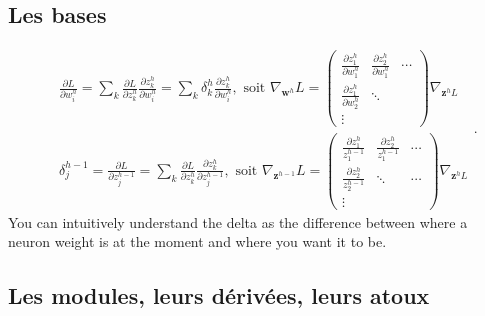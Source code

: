 \documentclass{article}
\theoremstyle{plain}%
\theoremstyle{definition}
\theoremstyle{remark}
\begin{document}
\subsection{Les bases}
\[
    \begin{aligned}
        & \frac{\partial L}{\partial w_i^h}=\sum_k \frac{\partial L}{\partial z_k^h} \frac{\partial z_k^h}{\partial w_i^h}=\sum_k \delta_k^h \frac{\partial z_k^h}{\partial w_i^h}, \text { soit } \nabla_{\mathbf{w}^h} L=\left(\begin{array}{ccc}
            \frac{\partial z_1^h}{\partial w_1^h} & \frac{\partial z_2^h}{\partial w_1^h} & \cdots \\
            \frac{\partial z_1^h}{\partial w_2^h} & \ddots & \\
            \vdots & &
        \end{array}\right) \nabla_{\mathbf{z}^h L} \\
        & \delta_j^{h-1}=\frac{\partial L}{\partial z_j^{h-1}}=\sum_k \frac{\partial L}{\partial z_k^h} \frac{\partial z_k^h}{\partial z_j^{h-1}}, \text { soit } \nabla_{\mathbf{z}^{h-1}} L=\left(\begin{array}{ccc}
            \frac{\partial z_1^h}{z_1^{h-1}} & \frac{\partial z_2^h}{z_1^{h-1}} & \cdots \\
            \frac{\partial z_2^h}{z_2^{h-1}} & \ddots & \cdots \\
        \vdots &
        \end{array}\right) \nabla_{\mathbf{z}^h L}
    \end{aligned}
.\]
You can intuitively understand the delta as the difference between where a neuron weight is at the moment and where you want it to be.

\subsection{Les modules, leurs dérivées, leurs atoux}
\end{document}
